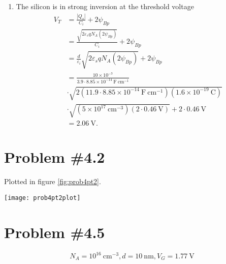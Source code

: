 \documentclass{article}
\begin{document}
\begin{enumerate}
{\begin{align*}
                    \frac{11.9}{3.9} 
                    \left|\frac{\sqrt{2} \cdot 4.21}
                               {5.84 \times 10^{-7} ~\mathrm{cm}}\right| \\
          &= 1.27 ~\mathrm{V}.
        \end{align*}
       }
  \item{The silicon is in strong inversion at the threshold voltage
        \begin{align*}
          V_T &= \frac{|Q_s|}{C_i} + 2 \psi_{Bp} \\
              &= \frac{\sqrt{2 \varepsilon_s q N_A (2 \psi_{Bp})}}{C_i} + 2\psi_{Bp} \\
              &= \frac{d}{\varepsilon_i}\sqrt{2 \varepsilon_s q N_A (2 \psi_{Bp})} + 2\psi_{Bp} \\
              &= \frac{10 \times 10^{-7}}
                      {3.9 \cdot 8.85 \times 10^{-14} ~\mathrm{F}~\mathrm{cm}^{-1}} \\
              &\cdot \sqrt{2(11.9 \cdot 8.85 \times 10^{-14} ~\mathrm{F}~\mathrm{cm}^{-1})
                        (1.6 \times 10^{-19} ~\mathrm{C})} \\
              &\cdot \sqrt{
                        (5 \times 10^{17} ~\mathrm{cm}^{-3})
                        (2 \cdot 0.46 ~\mathrm{V})}
               + 2 \cdot 0.46 ~\mathrm{V} \\
              &= 2.06 ~\mathrm{V}.
        \end{align*}
       }
\end{enumerate}

\pagebreak

\section*{Problem \#4.2}
Plotted in figure \ref{fig:prob4pt2}.

\begin{sidewaysfigure}
  \centering
  \texttt{[image: prob4pt2plot]}
  \caption{Surface charge plot for problem \#4.2. \label{fig:prob4pt2}}
\end{sidewaysfigure}

\section*{Problem \#4.5}
$$N_A = 10^{16} ~\mathrm{cm}^{-3}, d = 10 ~\mathrm{nm}, V_G = 1.77 ~\mathrm{V}$$
\end{document}
